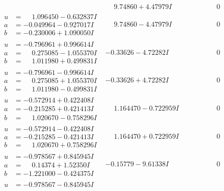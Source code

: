 \documentclass[1p]{elsarticle_modified}
\theoremstyle{definition}
\begin{document}
$$\begin{array}{c|c|c}
 & \phantom{-}9.74860 + 4.47979 I & \phantom{-0.000000 } 0 \\ \hline\begin{aligned}
u &= \phantom{-}1.096450 - 0.632837 I \\
a &= -0.049964 - 0.927017 I \\
b &= -0.230006 + 1.090050 I\end{aligned}
 & \phantom{-}9.74860 - 4.47979 I & \phantom{-0.000000 } 0 \\ \hline\begin{aligned}
u &= -0.796961 + 0.996614 I \\
a &= \phantom{-}0.275085 - 1.055370 I \\
b &= \phantom{-}1.011980 + 0.499831 I\end{aligned}
 & -0.33626 - 4.72282 I & \phantom{-0.000000 } 0 \\ \hline\begin{aligned}
u &= -0.796961 - 0.996614 I \\
a &= \phantom{-}0.275085 + 1.055370 I \\
b &= \phantom{-}1.011980 - 0.499831 I\end{aligned}
 & -0.33626 + 4.72282 I & \phantom{-0.000000 } 0 \\ \hline\begin{aligned}
u &= -0.572914 + 0.422408 I \\
a &= -0.215285 + 0.421413 I \\
b &= \phantom{-}1.020670 - 0.758296 I\end{aligned}
 & \phantom{-}1.164470 - 0.722959 I & \phantom{-0.000000 } 0 \\ \hline\begin{aligned}
u &= -0.572914 - 0.422408 I \\
a &= -0.215285 - 0.421413 I \\
b &= \phantom{-}1.020670 + 0.758296 I\end{aligned}
 & \phantom{-}1.164470 + 0.722959 I & \phantom{-0.000000 } 0 \\ \hline\begin{aligned}
u &= -0.978567 + 0.845945 I \\
a &= \phantom{-}0.14374 + 1.52350 I \\
b &= -1.221000 - 0.424375 I\end{aligned}
 & -0.15779 - 9.61338 I & \phantom{-0.000000 } 0 \\ \hline\begin{aligned}
u &= -0.978567 - 0.845945 I \\

\end{aligned}
\end{array}$$
\end{document}
